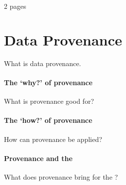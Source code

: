 \newline

2 pages

\section{Data Provenance}
What is data provenance.
\paragraph{The `why?' of provenance}
What is provenance good for?
\paragraph{The `how?' of provenance}
How can provenance be applied?
\paragraph{Provenance and the \ivfsystem}
What does provenance bring for the \ivfsystem?